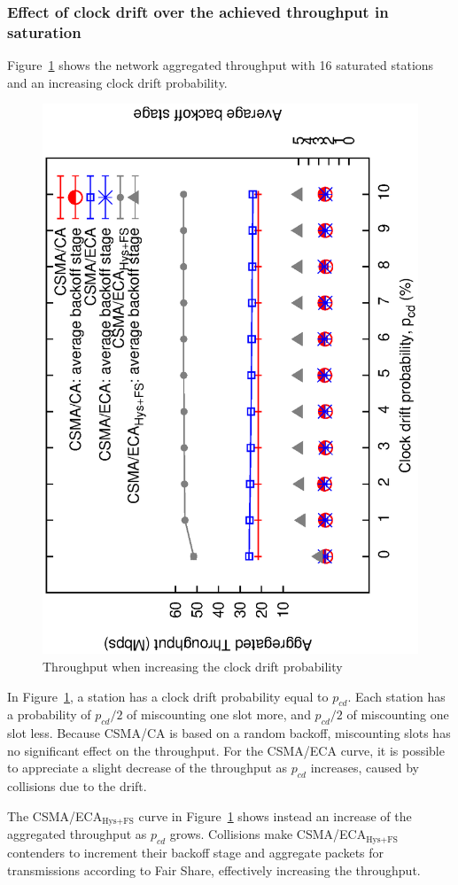 \documentclass[a4paper,journal]{IEEEtran}
\begin{document}
	\subsubsection{Effect of clock drift over the achieved throughput in saturation}\label{performanceClockDrift}
	Figure~\ref{fig:clockDrift} shows the network aggregated throughput with 16 saturated stations and an increasing clock drift probability.
	
	\begin{figure}[tb]
	\centering
		\includegraphics[width=0.7\linewidth,angle=-90]{figures/clockDrift/throughput_and_BOS_w_SD.eps}
		\caption{Throughput when increasing the clock drift probability}
		\label{fig:clockDrift}
	\end{figure}
	
	In Figure~\ref{fig:clockDrift}, a station has a clock drift probability equal to $p_{cd}$. Each station has a probability of $p_{cd}/2$ of miscounting one slot more, and $p_{cd}/2$ of miscounting one slot less. Because CSMA/CA is based on a random backoff, miscounting slots has no significant effect on the throughput. For the CSMA/ECA curve, it is possible to appreciate a slight decrease of the throughput as $p_{cd}$ increases, caused by collisions due to the drift.
	
	The CSMA/ECA$_{\text{Hys+FS}}$ curve in Figure~\ref{fig:clockDrift} shows instead an increase of the aggregated throughput as $p_{cd}$ grows. Collisions make CSMA/ECA$_{\text{Hys+FS}}$ contenders to increment their backoff stage and aggregate packets for transmissions according to Fair Share, effectively increasing the throughput. 
	
\end{document}
